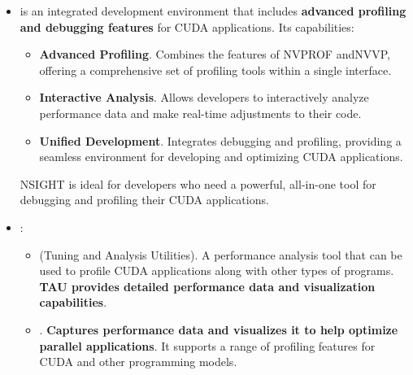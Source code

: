 \begin{itemize}
    \item {} is an integrated development environment that includes \textbf{advanced profiling and debugging features} for CUDA applications. Its capabilities:
    \begin{itemize}
        \item \textbf{Advanced Profiling}. Combines the features of NVPROF and\break NVVP, offering a comprehensive set of profiling tools within a single interface.
        \item \textbf{Interactive Analysis}. Allows developers to interactively analyze performance data and make real-time adjustments to their code.
        \item \textbf{Unified Development}. Integrates debugging and profiling, providing a seamless environment for developing and optimizing CUDA applications.
    \end{itemize}
    NSIGHT is ideal for developers who need a powerful, all-in-one tool for debugging and profiling their CUDA applications.

    \item {}:
    \begin{itemize}
        \item {} (Tuning and Analysis Utilities). A performance analysis tool that can be used to profile CUDA applications along with other types of programs. \textbf{TAU provides detailed performance data and visualization capabilities}.
        \item {}. \textbf{Captures performance data and visualizes it to help optimize parallel applications}. It supports a range of profiling features for CUDA and other programming models.
    \end{itemize}
\end{itemize}

